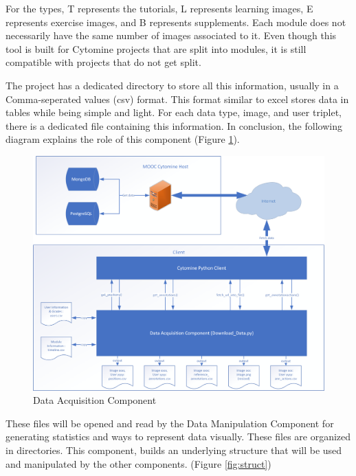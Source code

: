 \documentclass[a4paper,11pt]{report}
\numberwithin{figure}{chapter} %
\begin{document}
\begin{itemize}
            For the types, T represents the tutorials, L represents learning images, E represents exercise images, and B represents supplements.
            Each module does not necessarily have the same number of images associated to it.
            Even though this tool is built for Cytomine projects that are split into modules, it is still compatible with projects that do not get split.
        \end{itemize}


        The project has a dedicated directory to store all this information, usually in a Comma-seperated values (csv) format.
        This format similar to excel stores data in tables while being simple and light.
        For each data type, image, and user triplet, there is a dedicated file containing this information.
        In conclusion, the following diagram explains the role of this component (Figure \ref{fig:comp1}).

       \begin{figure}[H]
        \centering
         \includegraphics[width=.8\linewidth]{diagrams/module1.png}
         \caption{Data Acquisition Component}
         \label{fig:comp1}
       \end{figure}

        These files will be opened and read by the Data Manipulation Component for generating statistics and ways to represent data visually.
        These files are organized in directories.
        This component, builds an underlying structure that will be used and manipulated by the other components. (Figure \ref{fig:struct})
\end{document}

